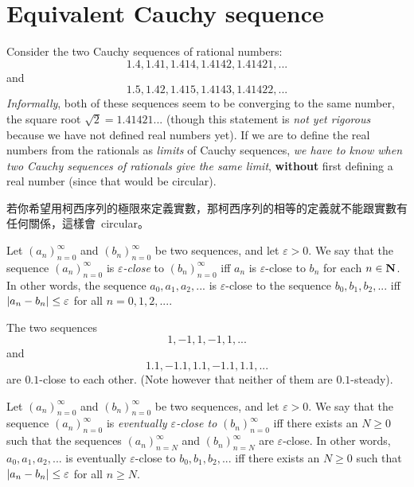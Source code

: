 \section{Equivalent Cauchy sequence} \label{sec 5.2}

Consider the two Cauchy sequences of rational numbers:
\[
    1.4, 1.41, 1.414, 1.4142, 1.41421,...
\]
and
\[
    1.5, 1.42, 1.415, 1.4143, 1.41422,...
\]
\emph{Informally}, both of these sequences seem to be converging to the same number, the square root
\(\sqrt{2} = 1.41421...\)
(though this statement is \emph{not yet rigorous} because we have not defined real numbers yet).
If we are to define the real numbers from the rationals as \emph{limits} of Cauchy sequences, \emph{we have to know when two Cauchy sequences of rationals give the same limit}, \textbf{without} first defining a real number
(since that would be circular).

\begin{note}
若你希望用柯西序列的極限來定義實數，那柯西序列的相等的定義就不能跟實數有任何關係，這樣會\ circular。
\end{note}

\begin{definition}  \label{def 5.2.1}
Let \((a_n)_{n = 0}^{\infty}\) and \((b_n)_{n = 0}^{\infty}\) be two sequences,
and let \(\varepsilon > 0\).
We say that the sequence \((a_n)_{n = 0}^{\infty}\) is \emph{\(\varepsilon\)-close} to \((b_n)_{n = 0}^{\infty}\) iff \(a_n\) is \(\varepsilon\)-close to \(b_n\) for each \(n \in \mathbf{N}\).
In other words, the sequence \(a_0, a_1, a_2,...\) is \(\varepsilon\)-close to the sequence \(b_0, b_1, b_2,...\) 
iff \(\lvert a_n - b_n\rvert \le \varepsilon\) for all \(n = 0, 1, 2,...\).
\end{definition}

\begin{example} \label{example 5.2.2}
The two sequences
\[
    1, -1, 1, -1, 1,...
\]
and
\[
    1.1, -1.1, 1.1, -1.1, 1.1,...
\]
are \(0.1\)-close to each other.
(Note however that neither of them are \(0.1\)-steady).
\end{example}

\begin{definition}  \label{def 5.2.3}
Let \((a_n)_{n = 0}^{\infty}\) and \((b_n)_{n = 0}^{\infty}\) be two sequences, and let \(\varepsilon > 0\).
We say that the sequence \((a_n)_{n = 0}^{\infty}\) is \emph{eventually \(\varepsilon\)-close to} \((b_n)_{n = 0}^{\infty}\)
iff there exists an \(N \ge 0\) such that the sequences \((a_n)_{n = N}^{\infty}\) and \((b_n)_{n = N}^{\infty}\) are \(\varepsilon\)-close.
In other words, \(a_0, a_1, a_2,...\) is eventually \(\varepsilon\)-close to \(b_0, b_1, b_2,...\)
iff there exists an \(N \ge 0\) such that \(\lvert a_n - b_n\rvert \le \varepsilon\) for all \(n \ge N\).
\end{definition}

